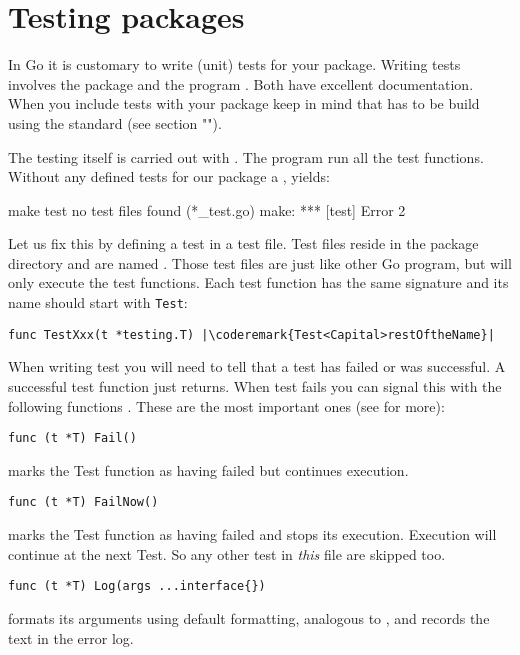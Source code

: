 \section{Testing packages}
In Go it is customary to write (unit) tests for your package. Writing
tests involves the  package and the program . Both
have excellent documentation. When you include tests with your package
keep in mind that has to be build using the standard 
(see section "").

The testing itself is carried out with .
The  program run all the test functions. Without any
defined tests for our  package a , yields:
\begin{display}
\pr make test
no test files found (*_test.go)
make: *** [test] Error 2
\end{display}
Let us fix this by defining a test in a test file. Test files reside
in the package directory and are named . Those test
files are just like other Go program, but  will only
execute the test functions.
Each test function has the same signature and its name should start
with \lstinline{Test}:
\begin{lstlisting}
func TestXxx(t *testing.T) |\coderemark{Test<Capital>restOftheName}|
\end{lstlisting}

When writing test you will need to tell  that a test has
failed or was successful. A successful test function just returns. When
test fails you can signal this with the following
functions \cite{go_doc}. These are the most important ones (see 
for more):

\begin{lstlisting}[numbers=none]
func (t *T) Fail()
\end{lstlisting}
 marks the Test function as having failed but continues execution.

\begin{lstlisting}[numbers=none]
func (t *T) FailNow()
\end{lstlisting}
 marks the Test function as having failed and stops its execution.
Execution will continue at the next Test. So any other test in
\emph{this} file are skipped too.

\begin{lstlisting}[numbers=none]
func (t *T) Log(args ...interface{})
\end{lstlisting}
 formats its arguments using default formatting, analogous to
, and records the text in the error log.

